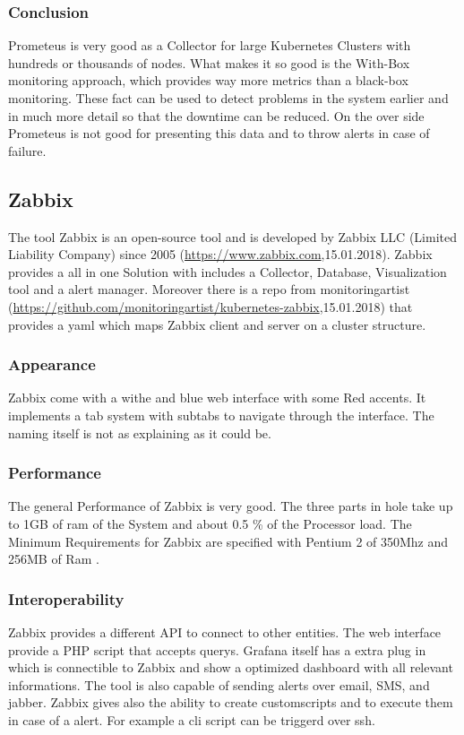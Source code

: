 \subsubsection{Conclusion}
Prometeus is very good as a Collector for large Kubernetes Clusters with hundreds or thousands of nodes. What makes it so good is the With-Box monitoring approach, which provides way more metrics than a black-box monitoring. These fact can be used to detect problems in the system earlier and in much more detail so that the downtime can be reduced. On the over side Prometeus is not good for presenting this data and to throw alerts in case of failure.

\subsection{Zabbix}
\label{Zabbix} %
\cite{Hernantes2015}
The tool Zabbix is an open-source tool and is developed by Zabbix LLC (Limited Liability Company) since 2005 (\url{https://www.zabbix.com},15.01.2018). Zabbix provides a all in one Solution with includes a Collector, Database, Visualization tool and a alert manager. Moreover there is a repo from monitoringartist (\url{https://github.com/monitoringartist/kubernetes-zabbix},15.01.2018) that provides a yaml which maps Zabbix client and server on a cluster structure.  
\subsubsection{Appearance}%
Zabbix come with a withe and blue web interface with some Red accents. It implements a tab system with subtabs to navigate through the interface. The naming itself is not as explaining as it could be.  
\subsubsection{Performance}
The general Performance of Zabbix is very good. The three parts in hole take up to 1GB of ram of the System and about 0.5 \% of the Processor load. The Minimum Requirements for Zabbix are specified with Pentium 2 of 350Mhz and 256MB of Ram \cite{Marik2014}.
\subsubsection{Interoperability}
Zabbix provides a different API to connect to other entities. The web interface  provide a PHP script that accepts querys. Grafana itself has a extra plug in which is connectible to Zabbix and show a optimized dashboard with all relevant informations. The tool is also capable of sending alerts over email, SMS, and jabber. Zabbix gives also the ability to create customscripts and to execute them in case of a alert. For example a cli script can be triggerd over ssh. 
